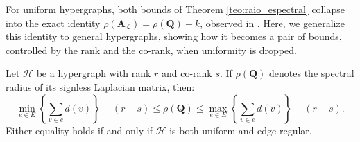 \documentclass[12pt,reqno]{amsart}
\begin{document}
For uniform hypergraphs, both bounds of Theorem \ref{teo:raio_espectral} collapse into the exact identity $\rho(\mathbf{A}_{\mathcal{L}}) = \rho(\mathbf{Q}) - k$, observed in \cite{kaue-lap}. Here, we generalize this identity to general hypergraphs, showing how it becomes a pair of bounds, controlled by the rank and the co-rank, when uniformity is dropped.

\begin{theorem}\label{teo:qcotas}
Let $\mathcal{H}$ be a hypergraph with rank $r$ and co-rank $s$. If $\rho(\mathbf{Q})$ denotes the spectral radius of its signless Laplacian matrix, then:
\begin{equation*}
\min_{e\in E} \left\{ \sum_{v \in e} d(v) \right\} - (r-s) \leq \rho(\mathbf{Q}) \leq \max_{e\in E} \left\{ \sum_{v \in e} d(v) \right\} + (r-s).
\end{equation*}
Either equality holds if and only if $\mathcal{H}$ is both uniform and edge-regular.
\end{theorem}
\end{document}
